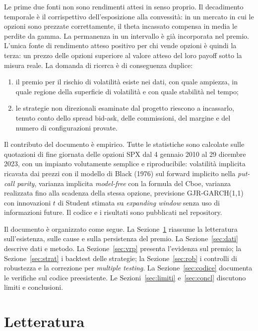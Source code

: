 \documentclass[11pt,a4paper]{article}
\begin{document}
Le prime due fonti non sono rendimenti attesi in senso proprio. Il decadimento temporale è il corrispettivo dell'esposizione alla convessità: in un mercato in cui le opzioni sono prezzate correttamente, il theta incassato compensa in media le perdite da gamma. La permanenza in un intervallo è già incorporata nel premio. L'unica fonte di rendimento atteso positivo per chi vende opzioni è quindi la terza: un prezzo delle opzioni superiore al valore atteso del loro payoff sotto la misura reale. La domanda di ricerca è di conseguenza duplice:
\begin{enumerate}
\item il premio per il rischio di volatilità esiste nei dati, con quale ampiezza, in quale regione della superficie di volatilità e con quale stabilità nel tempo;
\item le strategie non direzionali esaminate dal progetto riescono a incassarlo, tenuto conto dello spread bid-ask, delle commissioni, del margine e del numero di configurazioni provate.
\end{enumerate}

Il contributo del documento è empirico. Tutte le statistiche sono calcolate sulle quotazioni di fine giornata delle opzioni SPX dal 4 gennaio 2010 al 29 dicembre 2023, con un impianto volutamente semplice e riproducibile: volatilità implicita ricavata dai prezzi con il modello di Black (1976) sul forward implicito nella \emph{put-call parity}, varianza implicita \emph{model-free} con la formula del Cboe, varianza realizzata fino alla scadenza della stessa opzione, previsione GJR-GARCH(1,1) con innovazioni $t$ di Student stimata su \emph{expanding window} senza uso di informazioni future. Il codice e i risultati sono pubblicati nel repository.

Il documento è organizzato come segue. La Sezione~\ref{sec:lett} riassume la letteratura sull'esistenza, sulle cause e sulla persistenza del premio. La Sezione~\ref{sec:dati} descrive dati e metodo. La Sezione~\ref{sec:vrp} presenta l'evidenza sul premio; la Sezione~\ref{sec:strat} i backtest delle strategie; la Sezione~\ref{sec:rob} i controlli di robustezza e la correzione per \emph{multiple testing}. La Sezione~\ref{sec:codice} documenta le verifiche sul codice preesistente. Le Sezioni~\ref{sec:limiti} e~\ref{sec:concl} discutono limiti e conclusioni.

\section{Letteratura}\label{sec:lett}
\end{document}

